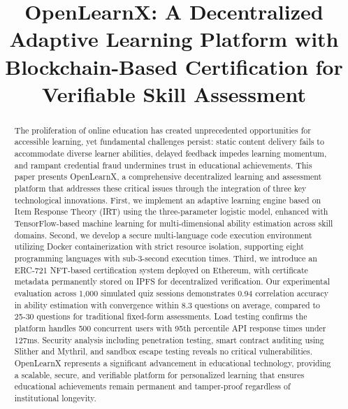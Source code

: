 \documentclass[conference]{IEEEtran}
\begin{document}
\title{OpenLearnX: A Decentralized Adaptive Learning Platform with Blockchain-Based Certification for Verifiable Skill Assessment}

\author{
}

\maketitle

\begin{abstract}
The proliferation of online education has created unprecedented opportunities for accessible learning, yet fundamental challenges persist: static content delivery fails to accommodate diverse learner abilities, delayed feedback impedes learning momentum, and rampant credential fraud undermines trust in educational achievements. This paper presents OpenLearnX, a comprehensive decentralized learning and assessment platform that addresses these critical issues through the integration of three key technological innovations. First, we implement an adaptive learning engine based on Item Response Theory (IRT) using the three-parameter logistic model, enhanced with TensorFlow-based machine learning for multi-dimensional ability estimation across skill domains. Second, we develop a secure multi-language code execution environment utilizing Docker containerization with strict resource isolation, supporting eight programming languages with sub-3-second execution times. Third, we introduce an ERC-721 NFT-based certification system deployed on Ethereum, with certificate metadata permanently stored on IPFS for decentralized verification. Our experimental evaluation across 1,000 simulated quiz sessions demonstrates 0.94 correlation accuracy in ability estimation with convergence within 8.3 questions on average, compared to 25-30 questions for traditional fixed-form assessments. Load testing confirms the platform handles 500 concurrent users with 95th percentile API response times under 127ms. Security analysis including penetration testing, smart contract auditing using Slither and Mythril, and sandbox escape testing reveals no critical vulnerabilities. OpenLearnX represents a significant advancement in educational technology, providing a scalable, secure, and verifiable platform for personalized learning that ensures educational achievements remain permanent and tamper-proof regardless of institutional longevity.
\end{abstract}
\end{document}
